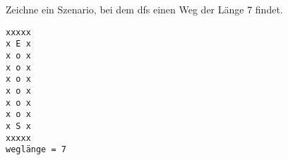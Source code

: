 \question[1]
Zeichne ein Szenario, bei dem dfs einen Weg der Länge 7 findet.

\begin{solutionbox}{5cm}
\begin{lstlisting}
xxxxx
x E x
x o x
x o x
x o x
x o x
x o x
x o x
x S x
xxxxx
weglänge = 7
\end{lstlisting}
\end{solutionbox}

